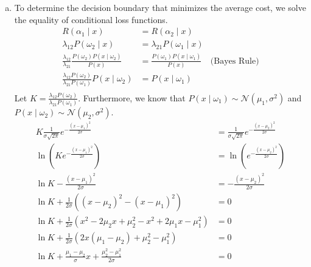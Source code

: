 \documentclass[a4paper, 10pt, twoside]{article}
\begin{document}
\begin{enumerate}[a)]
    \item To determine the decision boundary that minimizes the average cost, we solve the equality of conditional loss functions.
          \begin{align*}
              R(\alpha_1 \mid x)                                                          & = R(\alpha_2 \mid x)                                               \\
              \lambda_{12}P(\omega_2 \mid x)                                              & = \lambda_{21}P(\omega_1 \mid x)                                   \\
              \frac{\lambda_{12}}{\lambda_{21}}\frac{P(\omega_2)P(x \mid \omega_2)}{P(x)} & = \frac{P(\omega_1)P(x \mid \omega_1)}{P(x)} & \text{(Bayes Rule)} \\
              \frac{\lambda_{12}P(\omega_2)}{\lambda_{21}P(\omega_1)}P(x \mid \omega_2)   & = P(x \mid \omega_1)                                               \\
          \end{align*}
          Let $K = \frac{\lambda_{12}P(\omega_2)}{\lambda_{21}P(\omega_1)}$. Furthermore, we know that $P(x \mid \omega_1) \sim \mathcal{N}(\mu_1,\sigma^{2})$ and $P(x \mid \omega_2) \sim \mathcal{N}(\mu_2,\sigma^{2})$.
          \begin{align*}
              K\frac{1}{\sigma\sqrt{2\pi}}e^{-\frac{(x-\mu_1)^2}{2\sigma}}          & = \frac{1}{\sigma\sqrt{2\pi}}e^{-\frac{(x-\mu_2)^2}{2\sigma}} \\
              \ln{(Ke^{-\frac{(x-\mu_1)^2}{2\sigma}})}                              & = \ln{(e^{-\frac{(x-\mu_2)^2}{2\sigma}})}                     \\
              \ln K - \frac{(x-\mu_1)^2}{2\sigma}                                   & = -\frac{(x-\mu_2)^2}{2\sigma}                                \\
              \ln K + \frac{1}{2\sigma}((x-\mu_2)^2 - (x-\mu_1)^2)                  & = 0                                                           \\
              \ln K + \frac{1}{2\sigma}(x^2 -2\mu_2x+\mu_2^2-x^2+2\mu_1x-\mu_1^2)   & = 0                                                           \\
              \ln K + \frac{1}{2\sigma}(2x(\mu_1-\mu_2)+\mu_2^2-\mu_1^2)            & = 0                                                           \\
              \ln K + \frac{\mu_1-\mu_2}{\sigma}x + \frac{\mu_2^2-\mu_1^2}{2\sigma} & = 0                                                           \\

\end{align*}
\end{enumerate}
\end{document}

